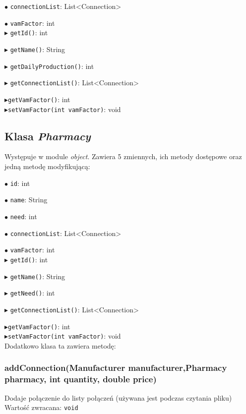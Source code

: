 \documentclass[]{article}
\begin{document}
    $\bullet$ \verb|connectionList|: List<Connection>

    $\bullet$ \verb|vamFactor|: int\\

    $ \blacktriangleright $ \verb|getId()|: int

    $ \blacktriangleright $ \verb|getName()|: String

    $ \blacktriangleright $ \verb|getDailyProduction()|: int

    $ \blacktriangleright $ \verb|getConnectionList()|: List<Connection>

    $ \blacktriangleright $\verb|getVamFactor()|: int\\

    $ \blacktriangleright $\verb|setVamFactor(int vamFactor)|: void

    \subsection{Klasa \textit{Pharmacy}}
    Występuje w module \textit{object}.
    Zawiera 5 zmiennych, ich metody dostępowe oraz jedną metodę modyfikującą:

    $\bullet$ \verb|id|: int

    $\bullet$ \verb|name|: String

    $\bullet$ \verb|need|: int

    $\bullet$ \verb|connectionList|: List<Connection>

    $\bullet$ \verb|vamFactor|: int\\

    $ \blacktriangleright $ \verb|getId()|: int

    $ \blacktriangleright $ \verb|getName()|: String

    $ \blacktriangleright $ \verb|getNeed()|: int

    $ \blacktriangleright $ \verb|getConnectionList()|: List<Connection>

    $ \blacktriangleright $\verb|getVamFactor()|: int\\

    $ \blacktriangleright $\verb|setVamFactor(int vamFactor)|: void\\

    Dodatkowo klasa ta zawiera metodę:

    \subsubsection{addConnection(Manufacturer manufacturer,Pharmacy pharmacy, int quantity, double price)}
    Dodaje połączenie do listy połączeń (używana jest podczas czytania pliku)\\
    Wartość zwracana: \verb|void|
\end{document}
